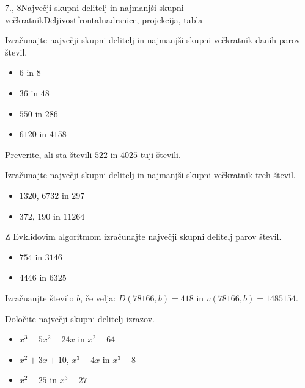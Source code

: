 \begin{priprava}{7., 8}{}{Največji skupni delitelj in najmanjši skupni večkratnik}{Deljivost}{frontalna}{drsnice, projekcija, tabla}
~\\
\begin{naloga}
    Izračunajte največji skupni delitelj in najmanjši skupni večkratnik danih parov števil.
    \begin{itemize}
        \item $6$ in $8$ 
        \item $36$ in $48$ 
        \item $550$ in $286$ 
        \item $6120$ in $4158$ 
    \end{itemize}
\end{naloga}

\begin{naloga}
    Preverite, ali sta števili $522$ in $4025$ tuji števili. 
\end{naloga}

\begin{naloga}
    Izračunajte največji skupni delitelj in najmanjši skupni večkratnik treh števil.
    \begin{itemize}
        \item $1320$, $6732$ in $297$ 
        \item $372$, $190$ in $11264$ 
    \end{itemize}
\end{naloga}

\begin{naloga}
    Z Evklidovim algoritmom izračunajte največji skupni delitelj parov števil.
    \begin{itemize}
        \item $754$ in $3146$ 
        \item $4446$ in $6325$ 
    \end{itemize}
\end{naloga}

\begin{naloga}
    Izračuanjte število $b$, če velja: $D(78 166, b)=418$ in $v(78 166, b)=1 485 154$. 
\end{naloga}

\begin{naloga}
    Določite največji skupni delitelj izrazov.
    \begin{itemize}
        \item $x^3-5x^2-24x$ in $x^2-64$ 
        \item $x^2+3x+10$, $x^3-4x$ in $x^3-8$ 
        \item $x^2-25$ in $x^3-27$ 
    \end{itemize}
\end{naloga}


\end{priprava}
